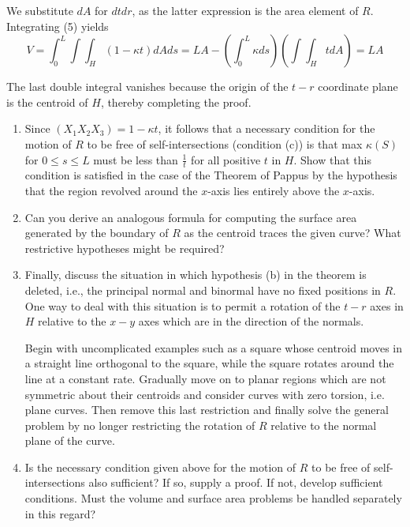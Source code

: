 \documentclass{book}
\begin{document}
\begin{description}
  We substitute $dA$ for $dtdr$, as the latter expression is the area element of $R$. Integrating (5) yields
  \begin{equation*}
  V = \int_{0}^{L} \int \int_{H}  ( 1 - \kappa t )  dA ds = LA -  \left( \int_{0}^{L} \kappa ds \right)  \left( \int \int_{H} t dA \right)  = LA
  \end{equation*}

  The last double integral vanishes because the origin of the $t-r$ coordinate plane is the centroid of $H$, thereby completing the proof.
\end{description}

\begin{enumerate}[1.]
  \item Since $(X_{1} X_{2} X_{3}) = 1 - \kappa t$, it follows that a necessary condition for the motion of $R$ to be free of self-intersections (condition (c)) is that max $\kappa (S)$ for $0 \leq s \leq L$ must be less than $\frac{1}{t}$ for all positive $t$ in $H$. Show that this condition is satisfied in the case of the Theorem of Pappus by the hypothesis that the region revolved around the $x$-axis lies entirely above the $x$-axis.
  \item Can you derive an analogous formula for computing the surface area generated by the boundary of $R$ as the centroid traces the given curve? What restrictive hypotheses might be required?
  \item Finally, discuss the situation in which hypothesis (b) in the theorem is deleted, i.e., the principal normal and binormal have no fixed positions in $R$. One way to deal with this situation is to permit a rotation of the $t-r$ axes in $H$ relative to the $x-y$ axes which are in the direction of the normals.

        Begin with uncomplicated examples such as a square whose centroid moves in a straight line orthogonal to the square, while the square rotates around the line at a constant rate. Gradually move on to planar regions which are not symmetric about their centroids and consider curves with zero torsion, i.e. plane curves. Then remove this last restriction and finally solve the general problem by no longer restricting the rotation of $R$ relative to the normal plane of the curve.
  \item Is the necessary condition given above for the motion of $R$ to be free of self-intersections also sufficient? If so, supply a proof. If not, develop sufficient conditions. Must the volume and surface area problems be handled separately in this regard?
\end{enumerate}
\end{document}
